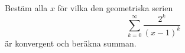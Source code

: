 \documentclass[11pt]{article}
\begin{document}

Bestäm alla $x$ för vilka den geometriska serien
\[
  \sum_{k = 0}^{\infty} \frac{2^k}{(x - 1)^k}
\]
är konvergent och beräkna summan.
\end{document}
